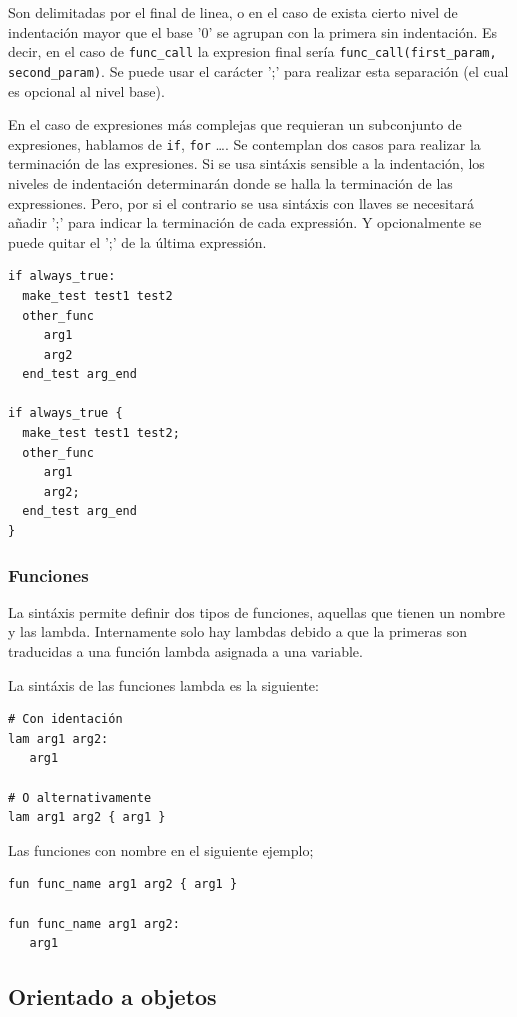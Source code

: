 \documentclass[11pt]{article}
\begin{document}
Son delimitadas por el final de linea, o en el caso de exista cierto nivel de indentación mayor que el base '0' se agrupan con la primera sin indentación. Es decir, en el caso de \texttt{func\_call}
la expresion final sería \texttt{func\_call(first\_param, second\_param)}. Se puede usar el carácter ';' para realizar esta separación (el cual es opcional al nivel base).

En el caso de expresiones más complejas que requieran un subconjunto de expresiones, hablamos de \texttt{if}, \texttt{for} \ldots{}. Se contemplan dos casos para realizar la terminación de las expresiones.
Si se usa sintáxis sensible a la indentación, los niveles de indentación determinarán donde se halla la terminación de las expressiones. Pero, por si el contrario se usa sintáxis con llaves
se necesitará añadir ';' para indicar la terminación de cada expressión. Y opcionalmente se puede quitar el ';' de la última expressión.

\begin{verbatim}
if always_true:
  make_test test1 test2
  other_func
     arg1
     arg2
  end_test arg_end

if always_true {
  make_test test1 test2;
  other_func
     arg1
     arg2;
  end_test arg_end
}
\end{verbatim}

\subsubsection{Funciones}
\label{sec:org2e553c9}

La sintáxis permite definir dos tipos de funciones, aquellas que tienen un nombre y las lambda. Internamente solo hay lambdas debido
a que la primeras son traducidas a una función lambda asignada a una variable.

La sintáxis de las funciones lambda es la siguiente:
\begin{verbatim}
# Con identación
lam arg1 arg2:
   arg1

# O alternativamente
lam arg1 arg2 { arg1 }
\end{verbatim}

Las funciones con nombre en el siguiente ejemplo;
\begin{verbatim}
fun func_name arg1 arg2 { arg1 }

fun func_name arg1 arg2:
   arg1
\end{verbatim}

\subsection{Orientado a objetos}
\label{sec:orgb530cb0}
\end{document}
